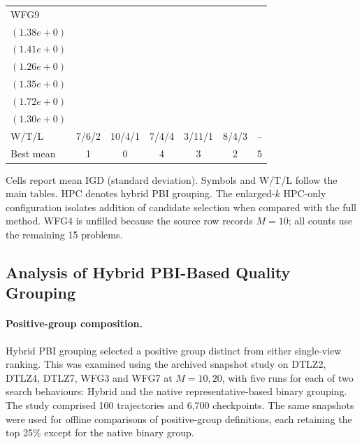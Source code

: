 \begin{table}[t]
\begin{tabular}{lcccccc}
WFG9 & \shortstack{$2.6155e+1^{-}$\\$(1.38e+0)$} & \shortstack{$2.4590e+1^{-}$\\$(1.41e+0)$} & \shortstack{$2.5690e+1^{-}$\\$(1.26e+0)$} & \shortstack{$2.4763e+1^{-}$\\$(1.35e+0)$} & \shortstack{$2.4951e+1^{-}$\\$(1.72e+0)$} & \shortstack{$\mathbf{2.3053e+1}$\\$(1.30e+0)$} \\
\midrule
W/T/L & 7/6/2 & 10/4/1 & 7/4/4 & 3/11/1 & 8/4/3 & -- \\
Best mean & 1 & 0 & 4 & 3 & 2 & 5 \\
\bottomrule
\end{tabular}
\par\smallskip
\begin{minipage}{\linewidth}
\scriptsize Cells report mean IGD (standard deviation). Symbols and W/T/L follow the main tables. HPC denotes hybrid PBI grouping. The enlarged-$k$ HPC-only configuration isolates addition of candidate selection when compared with the full method. WFG4 is unfilled because the source row records $M=10$; all counts use the remaining 15 problems.
\end{minipage}
\end{table}


\subsection{Analysis of Hybrid PBI-Based Quality Grouping}
\label{sec:exp:hpc}

\paragraph{Positive-group composition.}
Hybrid PBI grouping selected a positive group distinct from either
single-view ranking. This was examined using the archived snapshot study
on DTLZ2, DTLZ4, DTLZ7, WFG3 and WFG7 at $M=10,20$, with five runs for
each of two search behaviours: Hybrid and the native representative-based
binary grouping. The study comprised 100 trajectories and 6,700
checkpoints. The same snapshots were used for offline comparisons of
positive-group definitions, each retaining the top 25\% except for the
native binary group.

